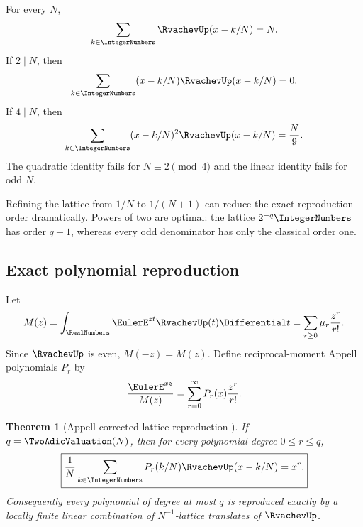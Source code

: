 \documentclass[11pt]{article}
\numberwithin{equation}{section}
\newtheorem{theorem}{Theorem}[section]
\theoremstyle{definition}
\theoremstyle{remark}
\begin{document}
\begin{example}
For every $N$,
\begin{equation}
 \sum_{k\in\IntegerNumbers}\RvachevUp(x-k/N)=N.                               \label{p2:eq:PU}
\end{equation}
If $2\mid N$, then
\begin{equation}
 \sum_{k\in\IntegerNumbers}(x-k/N)\RvachevUp(x-k/N)=0.                        \label{p2:eq:first-weight}
\end{equation}
If $4\mid N$, then
\begin{equation}
 \sum_{k\in\IntegerNumbers}(x-k/N)^2\RvachevUp(x-k/N)=\frac{N}{9}.           \label{p2:eq:second-weight}
\end{equation}
The quadratic identity fails for $N\equiv2\pmod4$ and the linear identity fails
for odd $N$.
\end{example}

\begin{remark}
Refining the lattice from $1/N$ to $1/(N+1)$ can reduce the exact reproduction
order dramatically.  Powers of two are optimal: the lattice $2^{-q}\IntegerNumbers$ has
order $q+1$, whereas every odd denominator has only the classical order one.
\end{remark}

\subsection{Exact polynomial reproduction}

Let
\begin{equation}
 M(z)=\int_{\RealNumbers}\EulerE^{zt}\RvachevUp(t)\Differential t
     =\sum_{r\ge0}\mu_r\frac{z^r}{r!}.                    \label{p2:eq:mgf}
\end{equation}
Since $\RvachevUp$ is even, $M(-z)=M(z)$.  Define reciprocal-moment Appell polynomials
$P_r$ by
\begin{equation}
 \frac{\EulerE^{xz}}{M(z)}=\sum_{r=0}^{\infty}P_r(x)\frac{z^r}{r!}.              \label{p2:eq:Pr}
\end{equation}

\begin{theorem}[Appell-corrected lattice reproduction \NewResult]
\label{p2:thm:reproduction}
If $q=\TwoAdicValuation(N)$, then for every polynomial degree $0\le r\le q$,
\begin{equation}
 \boxed{\frac1N\sum_{k\in\IntegerNumbers}P_r(k/N)\RvachevUp(x-k/N)=x^r.}      \label{p2:eq:reproduce}
\end{equation}
Consequently every polynomial of degree at most $q$ is reproduced exactly by a
locally finite linear combination of $N^{-1}$-lattice translates of $\RvachevUp$.
\end{theorem}
\end{document}
